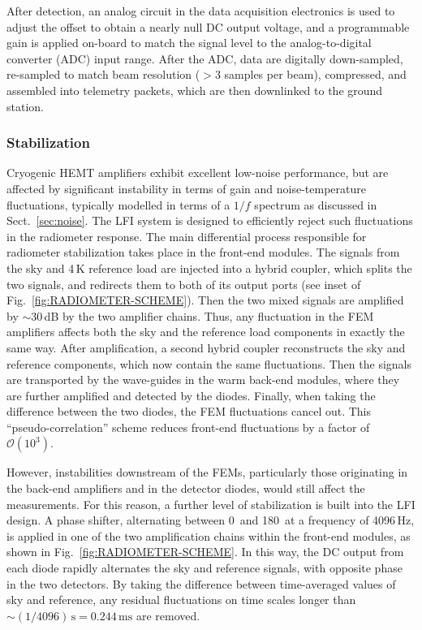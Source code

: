\documentclass[twocolumn]{aa}
\begin{document}
After detection, an analog circuit in the data acquisition electronics
is used to adjust the offset to obtain a nearly null DC output
voltage, and a programmable gain is applied on-board to match the signal level
to the analog-to-digital converter (ADC) input range. After the ADC,
data are digitally down-sampled, re-sampled to match beam resolution
($>3$ samples per beam), compressed, and assembled into telemetry
packets, which are then downlinked to the ground station.


\subsubsection{Stabilization}

Cryogenic HEMT amplifiers exhibit excellent low-noise performance, but
are affected by significant instability in terms of gain and
noise-temperature fluctuations, typically modelled in terms of a $1/f$
spectrum as discussed in Sect.~\ref{sec:noise}. The LFI system is
designed to efficiently reject such fluctuations in the radiometer
response. The main differential process responsible for radiometer
stabilization takes place in the front-end modules. The signals from
the sky and 4\,K reference load are injected into a hybrid coupler,
which splits the two signals, and redirects them to both of its output
ports (see inset of Fig.~\ref{fig:RADIOMETER-SCHEME}). Then the two
mixed signals are amplified by $\sim$30\,dB by the two amplifier
chains. Thus, any fluctuation in the FEM amplifiers affects both the
sky and the reference load components in exactly the same way. After
amplification, a second hybrid coupler reconstructs the sky and
reference components, which now contain the same fluctuations. Then
the signals are transported by the wave-guides in the warm back-end
modules, where they are further amplified and detected by the
diodes. Finally, when taking the difference between the two diodes,
the FEM fluctuations cancel out. This ``pseudo-correlation'' scheme
reduces front-end fluctuations by a factor of $\mathcal{O}(10^{3})$.

However, instabilities downstream of the FEMs, particularly those
originating in the back-end amplifiers and in the detector diodes,
would still affect the measurements. For this reason, a further level
of stabilization is built into the LFI design. A phase shifter,
alternating between 0\deg\ and 180\deg\ at a frequency of 4096\,Hz,
is applied in one of the two amplification chains within the front-end
modules, as shown in Fig.~\ref{fig:RADIOMETER-SCHEME}. In this way, the DC
output from each diode rapidly alternates the sky and reference
signals, with opposite phase in the two detectors. By taking the
difference between time-averaged values of sky and reference, any
residual fluctuations on time scales longer than ${\sim (1/4096)\,\mathrm s=
0.244\,\mathrm{ms}}$ are removed.
\end{document}

